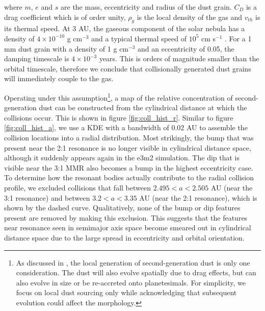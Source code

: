 \documentclass[twocolumn]{aastex63}
\begin{document}
\noindent where $m$, $e$ and $s$ are the mass, eccentricity and radius of the dust grain. $C_{D}$ is a drag coefficient which is of order unity, $
\rho_{g}$ is the local density of the gas and $v_{th}$ is its thermal speed. At 3 AU, the gaseous component of the solar nebula has a density of $4 
\times 10^{-10}$ g cm$^{-3}$ and a typical thermal speed of $10^{5}$ cm s$^{-1}$ \citep{1981PThPS..70...35H}. For a 1 mm dust grain with a 
density of 1 g cm$^{-3}$ and an eccentricity of 0.05, the damping timescale is $4 \times 10^{-3}$ years. This is orders of magnitude smaller than the 
orbital timescale, therefore we conclude that collisionally generated dust grains will immediately couple to the gas.

Operating under this assumption\footnote{As discussed in \cite{2017ApJ...850..103B}, the local generation of second-generation dust is only one 
consideration.  The dust will also evolve spatially due to drag effects, but can also evolve in size or be re-accreted onto planetesimals. For simplicity, 
we focus on local dust sourcing only while acknowledging that subsequent evolution could affect the morphology.}, a map of the relative concentration 
of second-generation dust can be constructed from the cylindrical distance at which the collisions occur. This is shown in figure \ref{fig:coll_hist_r}. 
Similar to figure \ref{fig:coll_hist_a}, we use a KDE with a bandwidth of 0.02 AU to assemble the collision locations into a radial distribution. Most 
strikingly, the bump that was present near the 2:1 resonance is no longer visible in cylindrical distance space, although it suddenly appears again in 
the e3m2 simulation. The dip that is visible near the 3:1 MMR also becomes a bump in the highest eccentricity case. To determine how the resonant 
bodies actually contribute to the radial collision profile, we excluded collisions that fall between $2.495 < a < 2.505$ AU (near the 3:1 resonance) and 
between $3.2 < a < 3.35$ AU (near the 2:1 resonance), which is shown by the dashed curve. Qualitatively, none of the bump or dip features present 
are removed by making this exclusion. This suggests that the features near resonance seen in semimajor axis space become smeared out in 
cylindrical distance space due to the large spread in eccentricity and orbital orientation.
\end{document}
